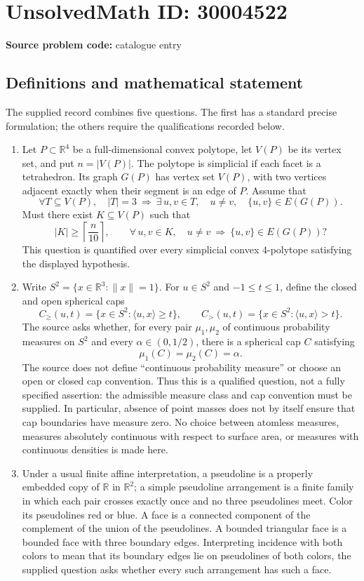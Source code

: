 \documentclass[11pt]{article}
\newcommand{\R}{\mathbb{R}}
\begin{document}
\section*{UnsolvedMath ID: 30004522}
\textbf{Source problem code:} catalogue entry
\subsection{Definitions and mathematical statement}
The supplied record combines five questions. The first has a standard precise formulation; the others require the qualifications recorded below.

\begin{enumerate}
\item Let \(P\subset\R^4\) be a full-dimensional convex polytope, let \(V(P)\) be its vertex set, and put \(n=|V(P)|\). The polytope is simplicial if each facet is a tetrahedron. Its graph \(G(P)\) has vertex set \(V(P)\), with two vertices adjacent exactly when their segment is an edge of \(P\). Assume that
\[
\forall T\subseteq V(P),\quad |T|=3\ \Longrightarrow\ \exists\,u,v\in T,\quad u\ne v,\quad \{u,v\}\in E(G(P)).
\]
Must there exist \(K\subseteq V(P)\) such that
\[
|K|\ge\left\lceil\frac n{10}\right\rceil,
\qquad
\forall\,u,v\in K,\quad u\ne v\ \Longrightarrow\ \{u,v\}\in E(G(P))?
\]
This question is quantified over every simplicial convex \(4\)-polytope satisfying the displayed hypothesis.

\item Write \(S^2=\{x\in\R^3:\|x\|=1\}\). For \(u\in S^2\) and \(-1\le t\le1\), define the closed and open spherical caps
\[
C_{\ge}(u,t)=\{x\in S^2:\langle u,x\rangle\ge t\},
\qquad
C_{>}(u,t)=\{x\in S^2:\langle u,x\rangle>t\}.
\]
The source asks whether, for every pair \(\mu_1,\mu_2\) of continuous probability measures on \(S^2\) and every \(\alpha\in(0,1/2)\), there is a spherical cap \(C\) satisfying
\[
\mu_1(C)=\mu_2(C)=\alpha.
\]
The source does not define ``continuous probability measure'' or choose an open or closed cap convention. Thus this is a qualified question, not a fully specified assertion: the admissible measure class and cap convention must be supplied. In particular, absence of point masses does not by itself ensure that cap boundaries have measure zero. No choice between atomless measures, measures absolutely continuous with respect to surface area, or measures with continuous densities is made here.

\item Under a usual finite affine interpretation, a pseudoline is a properly embedded copy of \(\R\) in \(\R^2\); a simple pseudoline arrangement is a finite family in which each pair crosses exactly once and no three pseudolines meet. Color its pseudolines red or blue. A face is a connected component of the complement of the union of the pseudolines. A bounded triangular face is a bounded face with three boundary edges. Interpreting incidence with both colors to mean that its boundary edges lie on pseudolines of both colors, the supplied question asks whether every such arrangement has such a face.


\end{enumerate}
\end{document}
